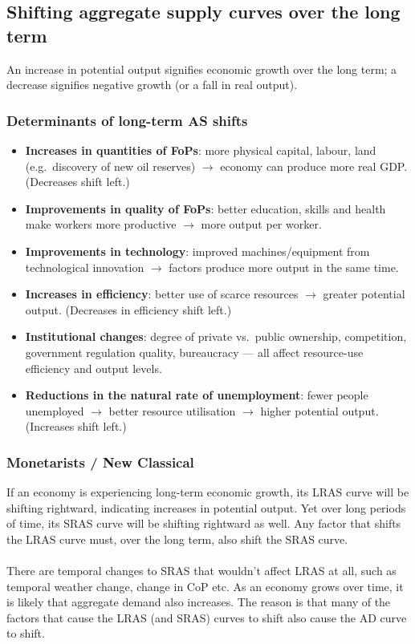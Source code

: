 \documentclass[a4paper,12pt]{article}
\begin{document}
\subsection{Shifting aggregate supply curves over the long term}
An increase in potential output signifies economic growth over the long term; a decrease signifies negative growth (or a fall in real output).
\subsubsection*{Determinants of long-term AS shifts}
\begin{itemize}
  \item \textbf{Increases in quantities of FoPs}: more physical capital, labour, land (e.g.\ discovery of new oil reserves) $\to$ economy can produce more real GDP. (Decreases shift left.)
  \item \textbf{Improvements in quality of FoPs}: better education, skills and health make workers more productive $\to$ more output per worker.
  \item \textbf{Improvements in technology}: improved machines/equipment from technological innovation $\to$ factors produce more output in the same time.
  \item \textbf{Increases in efficiency}: better use of scarce resources $\to$ greater potential output. (Decreases in efficiency shift left.)
  \item \textbf{Institutional changes}: degree of private vs.\ public ownership, competition, government regulation quality, bureaucracy --- all affect resource-use efficiency and output levels.
  \item \textbf{Reductions in the natural rate of unemployment}: fewer people unemployed $\to$ better resource utilisation $\to$ higher potential output. (Increases shift left.)
\end{itemize}
\subsubsection*{Monetarists / New Classical}
If an economy is experiencing long-term economic growth, its LRAS curve will be shifting rightward, indicating increases in potential output. Yet over long periods of
time, its SRAS curve will be shifting rightward as well. Any factor that shifts the LRAS curve must, over the long term, also shift the SRAS curve.\\\\
There are temporal changes to SRAS that wouldn't affect LRAS at all, such as temporal weather change, change in CoP etc. As an economy grows over time, it is likely that aggregate demand also increases. The reason is that many of the factors that cause the LRAS (and SRAS) curves to shift also cause the AD curve to shift.
\end{document}
